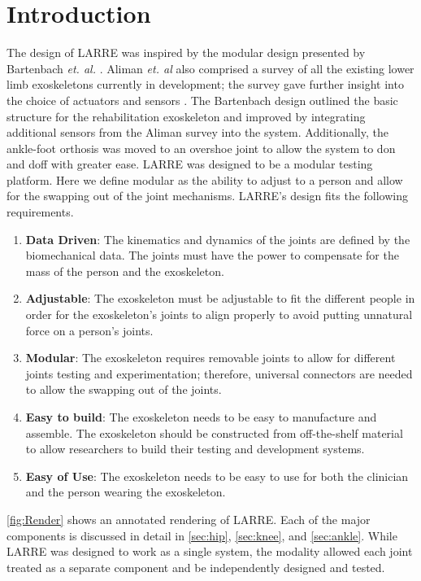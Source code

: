 \section{Introduction}
The design of LARRE was inspired by the modular design presented by Bartenbach \textit{et. al.} \cite{7523699}.  Aliman \textit{et. al} also comprised a survey of all the existing lower limb exoskeletons currently in development; the survey gave further insight into the choice of actuators and sensors \cite{aliman2017design}. The Bartenbach design outlined the basic structure for the rehabilitation exoskeleton and improved by integrating additional sensors from the Aliman survey into the system. Additionally, the ankle-foot orthosis was moved to an overshoe joint to allow the system to don and doff with greater ease.
LARRE was designed to be a modular testing platform. Here we define modular as the ability to adjust to a person and allow for the swapping out of the joint mechanisms. LARRE's design fits the following requirements. 


\begin{enumerate}[noitemsep]
\item \textbf{Data Driven}: The kinematics and dynamics of the joints are defined by the biomechanical data. The joints must have the power to compensate for the mass of the person and the exoskeleton. 
\item \textbf{Adjustable}: The exoskeleton must be adjustable to fit the different people in order for the exoskeleton's joints to align properly to avoid putting unnatural force on a person's joints. 
\item \textbf{Modular}: The exoskeleton requires removable joints to allow for different joints testing and experimentation; therefore, universal connectors are needed to allow the swapping out of the joints. 
\item \textbf{Easy to build}: The exoskeleton needs to be easy to manufacture and assemble. The exoskeleton should be constructed from off-the-shelf material to allow researchers to build their testing and development systems. 
\item \textbf{Easy of Use}: The exoskeleton needs to be easy to use for both the clinician and the person wearing the exoskeleton. 
\end{enumerate}

 \autoref{fig:Render} shows an annotated rendering of LARRE.  Each of the major components is discussed in detail in  \autoref{sec:hip}, \autoref{sec:knee}, and \autoref{sec:ankle}. While LARRE was designed to work as a single system, the modality allowed each joint treated as a separate component and be independently designed and tested. 

